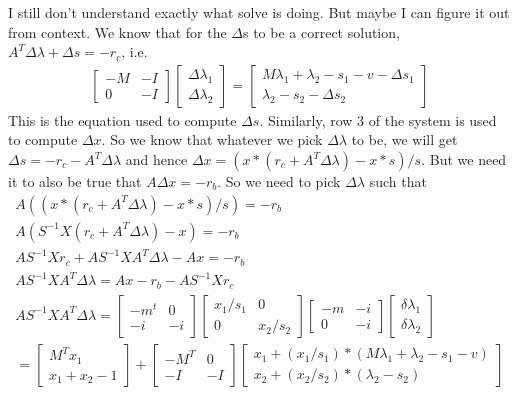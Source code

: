 \documentclass{article}
\begin{document}
I still don't understand exactly what solve is doing. But maybe I can figure it out from context. We know that for the $\Delta$s to be a correct solution, $A^T\Delta \lambda + \Delta s = -r_c$, i.e.
\begin{align}
		\begin{bmatrix}
				-M & -I\\
				0 & -I
		\end{bmatrix}\begin{bmatrix}
				\Delta \lambda_1\\
				\Delta \lambda_2
		\end{bmatrix} 
		= \begin{bmatrix}
				M\lambda_1 + \lambda_2 - s_1 - v - \Delta s_1\\
				\lambda_2 - s_2 - \Delta s_2
		\end{bmatrix}
\end{align}
This is the equation used to compute $\Delta s$. Similarly, row 3 of the system is used to compute $\Delta x$. So we know that whatever we pick $\Delta \lambda$ to be, we will get $\Delta s = -r_c - A^T\Delta \lambda$ and hence $\Delta x = (x * (r_c + A^T\Delta \lambda) - x*s) / s$. But we need it to also be true that $A\Delta x = -r_b$. So we need to pick $\Delta \lambda$ such that 
\begin{align*}
		A((x*(r_c + A^T\Delta \lambda) - x*s)/s) = -r_b\\
		A(S^{-1}X(r_c + A^T\Delta \lambda) - x) = -r_b\\
		AS^{-1}Xr_c + AS^{-1}XA^T\Delta \lambda - Ax = -r_b\\
		AS^{-1}XA^T\Delta \lambda = Ax - r_b - AS^{-1}Xr_c\\
		AS^{-1}XA^T \Delta \lambda = 
		\begin{bmatrix}
				-m^t & 0\\
				-i & -i
		\end{bmatrix}
		\begin{bmatrix}
				x_1/s_1 & 0\\
				0 & x_2/s_2
		\end{bmatrix}
		\begin{bmatrix}
				-m & -i\\
				0 & -i
		\end{bmatrix}
		\begin{bmatrix}
				\delta \lambda_1\\
				\delta \lambda_2
		\end{bmatrix}
		\\= 
		\begin{bmatrix}
				M^T x_1\\
				x_1 + x_2 - 1
		\end{bmatrix}
		+ \begin{bmatrix}
				-M^T & 0\\
				-I & -I
		\end{bmatrix}
		\begin{bmatrix}	
				x_1 + (x_1/s_1) * (M\lambda_1 + \lambda_2 - s_1 - v)\\
				x_2 + (x_2/s_2) * (\lambda_2 - s_2)
		\end{bmatrix}
\end{align*}
\end{document}
